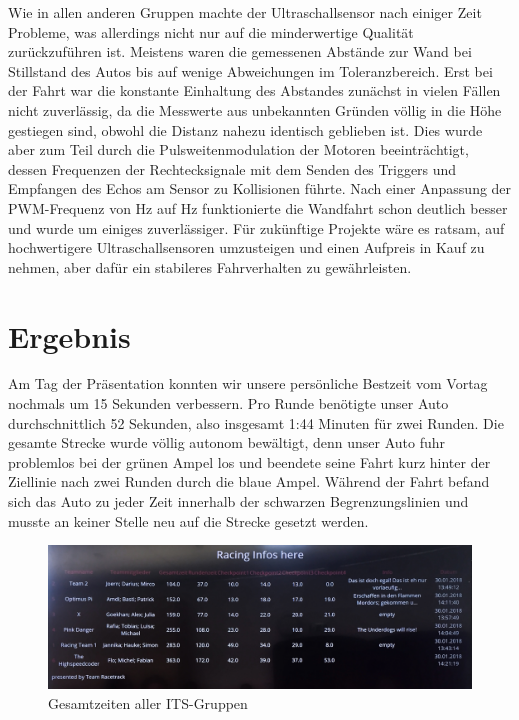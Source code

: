 \documentclass[a4paper, 12pt]{scrartcl}
\begin{document}
Wie in allen anderen Gruppen machte der Ultraschallsensor nach einiger Zeit Probleme, was allerdings nicht nur auf die minderwertige Qualität zurückzuführen ist. Meistens waren die gemessenen Abstände zur Wand bei Stillstand des Autos bis auf wenige Abweichungen im Toleranzbereich. Erst bei der Fahrt war die konstante Einhaltung des Abstandes zunächst in vielen Fällen nicht zuverlässig, da die Messwerte aus unbekannten Gründen völlig in die Höhe gestiegen sind, obwohl die Distanz nahezu identisch geblieben ist. Dies wurde aber zum Teil durch die Pulsweitenmodulation der Motoren beeinträchtigt, dessen Frequenzen der Rechtecksignale mit dem Senden des Triggers und Empfangen des Echos am Sensor zu Kollisionen führte. Nach einer Anpassung der PWM-Frequenz von \unit[70]{Hz} auf \unit[73]{Hz} funktionierte die Wandfahrt schon deutlich besser und wurde um einiges zuverlässiger. Für zukünftige Projekte wäre es ratsam, auf hochwertigere Ultraschallsensoren umzusteigen und einen Aufpreis in Kauf zu nehmen, aber dafür ein stabileres Fahrverhalten zu gewährleisten.

\section{Ergebnis}

Am Tag der Präsentation konnten wir unsere persönliche Bestzeit vom Vortag nochmals um 15 Sekunden verbessern. Pro Runde benötigte unser Auto durchschnittlich 52 Sekunden, also insgesamt 1:44 Minuten für zwei Runden. Die gesamte Strecke wurde völlig autonom bewältigt, denn unser Auto fuhr problemlos bei der grünen Ampel los und beendete seine Fahrt kurz hinter der Ziellinie nach zwei Runden durch die blaue Ampel. Während der Fahrt befand sich das Auto zu jeder Zeit innerhalb der schwarzen Begrenzungslinien und musste an keiner Stelle neu auf die Strecke gesetzt werden.

\begin{figure}[H]
	\centering
	\includegraphics[width=1\textwidth]{Racing_Infos.jpeg}
	\caption{Gesamtzeiten aller ITS-Gruppen}
\end{figure}
\end{document}
